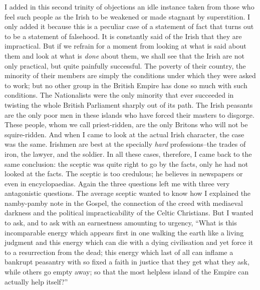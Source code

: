 \documentclass{book}
\begin{document}
I added in this second trinity of objections an idle instance taken from those who feel such people as the Irish to be weakened or made stagnant by superstition. I only added it because this is a peculiar case of a statement of fact that turns out to be a statement of falsehood. It is constantly said of the Irish that they are impractical. But if we refrain for a moment from looking at what is said about them and look at what is \emph{done} about them, we shall see that the Irish are not only practical, but quite painfully successful. The poverty of their country, the minority of their members are simply the conditions under which they were asked to work; but no other group in the British Empire has done so much with such conditions. The Nationalists were the only minority that ever succeeded in twisting the whole British Parliament sharply out of its path. The Irish peasants are the only poor men in these islands who have forced their masters to disgorge. These people, whom we call priest-ridden, are the only Britons who will not be squire-ridden. And when I came to look at the actual Irish character, the case was the same. Irishmen are best at the specially \emph{hard} professions–the trades of iron, the lawyer, and the soldier. In all these cases, therefore, I came back to the same conclusion: the sceptic was quite right to go by the facts, only he had not looked at the facts. The sceptic is too credulous; he believes in newspapers or even in encyclopaedias. Again the three questions left me with three very antagonistic questions. The average sceptic wanted to know how I explained the namby-pamby note in the Gospel, the connection of the creed with mediaeval darkness and the political impracticability of the Celtic Christians. But I wanted to ask, and to ask with an earnestness amounting to urgency, “What is this incomparable energy which appears first in one walking the earth like a living judgment and this energy which can die with a dying civilisation and yet force it to a resurrection from the dead; this energy which last of all can inflame a bankrupt peasantry with so fixed a faith in justice that they get what they ask, while others go empty away; so that the most helpless island of the Empire can actually help itself?”
\end{document}

